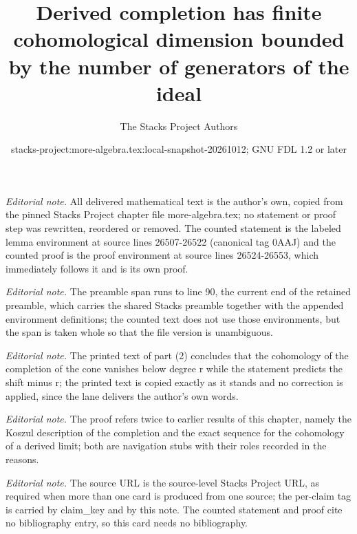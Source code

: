 \documentclass[10pt,a4paper]{amsart}
\title{Derived completion has finite cohomological dimension bounded by the number of generators of the ideal}
\author{The Stacks Project Authors}
\date{stacks-project:more-algebra.tex:local-snapshot-20261012; GNU FDL 1.2 or later}
\theoremstyle{plain}
\theoremstyle{definition}
\theoremstyle{remark}
\numberwithin{equation}{subsection}
\begin{document}
\maketitle
\setcounter{subsection}{1}
\noindent\textit{Editorial note.} All delivered mathematical text is the author's own, copied from the pinned Stacks Project chapter file more-algebra.tex; no statement or proof step was rewritten, reordered or removed. The counted statement is the labeled lemma environment at source lines 26507-26522 (canonical tag 0AAJ) and the counted proof is the proof environment at source lines 26524-26553, which immediately follows it and is its own proof.\par\medskip
\noindent\textit{Editorial note.} The preamble span runs to line 90, the current end of the retained preamble, which carries the shared Stacks preamble together with the appended environment definitions; the counted text does not use those environments, but the span is taken whole so that the file version is unambiguous.\par\medskip
\noindent\textit{Editorial note.} The printed text of part (2) concludes that the cohomology of the completion of the cone vanishes below degree r while the statement predicts the shift minus r; the printed text is copied exactly as it stands and no correction is applied, since the lane delivers the author's own words.\par\medskip
\noindent\textit{Editorial note.} The proof refers twice to earlier results of this chapter, namely the Koszul description of the completion and the exact sequence for the cohomology of a derived limit; both are navigation stubs with their roles recorded in the reasons.\par\medskip
\noindent\textit{Editorial note.} The source URL is the source-level Stacks Project URL, as required when more than one card is produced from one source; the per-claim tag is carried by claim\_key and by this note. The counted statement and proof cite no bibliography entry, so this card needs no bibliography.\par\medskip
\end{document}
